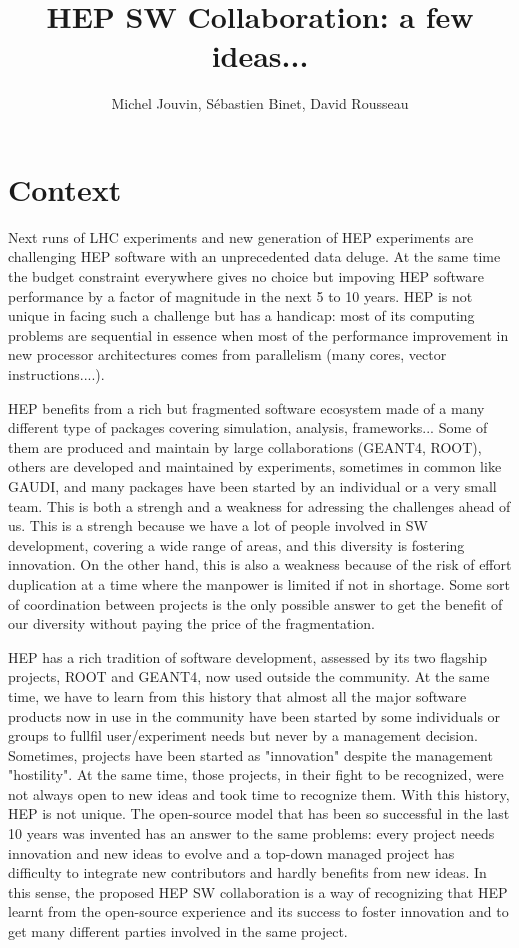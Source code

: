 \documentclass[11pt]{article} %
\title{HEP SW Collaboration: a few ideas...}
\author{Michel Jouvin, Sébastien Binet, David Rousseau}
\begin{document}
\maketitle

\section{Context}

Next runs of LHC experiments and new generation of HEP experiments are challenging HEP software with an unprecedented data deluge. At the same time the budget constraint everywhere gives no choice but impoving HEP software performance by a factor of magnitude in the next 5 to 10 years. HEP is not unique in facing such a challenge but has a handicap: most of its computing problems are sequential in essence when most of the performance improvement in new processor architectures comes from parallelism (many cores, vector instructions....).

HEP benefits from a rich but fragmented software ecosystem made of a many different type of packages covering simulation, analysis, frameworks... Some of them are produced and maintain by large collaborations (GEANT4, ROOT), others are developed and maintained by experiments, sometimes in common like GAUDI, and many packages have been started by an individual or a very small team. This is both a strengh and a weakness for adressing the challenges ahead of us. This is a strengh because we have a lot of people involved in SW development, covering a wide range of areas, and this diversity is fostering innovation. On the other hand, this is also a weakness because of the risk of effort duplication at a time where the manpower is limited if not in shortage. Some sort of coordination between projects is the only possible answer to get the benefit of our diversity without paying the price of the fragmentation.

HEP has a rich tradition of software development, assessed by its two flagship projects, ROOT and GEANT4, now used outside the community. At the same time, we have to learn from this history that almost all the major software products now in use in the community have been started by some individuals or groups to fullfil user/experiment needs but never by a management decision. Sometimes, projects have been started as "innovation" despite the management "hostility". At the same time, those projects, in their fight to be recognized, were not always open to new ideas and took time to recognize them. With this history, HEP is not unique. The open-source model that has been so successful in the last 10 years was invented has an answer to the same problems: every project needs innovation and new ideas to evolve and a top-down managed project has difficulty to integrate new contributors and hardly benefits from new ideas. In this sense, the proposed HEP SW collaboration is a way of recognizing that HEP learnt from the open-source experience and its success to foster innovation and to get many different parties involved in the same project.
\end{document}
